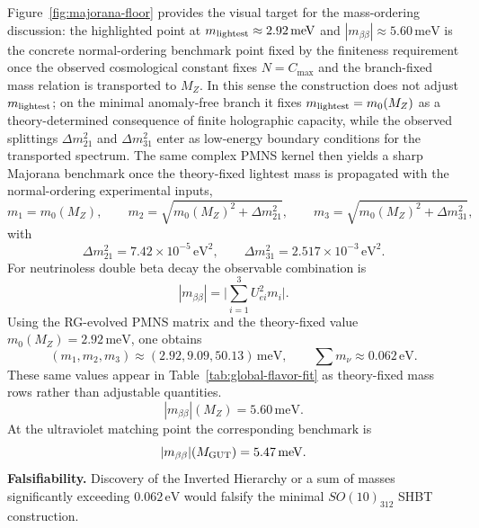 \documentclass[11pt]{article}
\begin{document}
Figure~\ref{fig:majorana-floor} provides the visual target for the mass-ordering discussion: the highlighted point at $m_{\rm lightest}\approx2.92\,\mathrm{meV}$ and $|m_{\beta\beta}|\approx5.60\,\mathrm{meV}$ is the concrete normal-ordering benchmark point fixed by the finiteness requirement once the observed cosmological constant fixes $N=C_{\max}$ and the branch-fixed mass relation is transported to $M_Z$. In this sense the construction does not adjust $m_{\rm lightest}$; on the minimal anomaly-free branch it fixes $m_{\rm lightest}=m_0(M_Z)$ as a theory-determined consequence of finite holographic capacity, while the observed splittings $\Delta m_{21}^2$ and $\Delta m_{31}^2$ enter as low-energy boundary conditions for the transported spectrum. The same complex PMNS kernel then yields a sharp Majorana benchmark once the theory-fixed lightest mass is propagated with the normal-ordering experimental inputs,
\begin{equation}
 m_1 = m_0(M_Z),
 \qquad
 m_2 = \sqrt{m_0(M_Z)^2 + \Delta m_{21}^2},
 \qquad
 m_3 = \sqrt{m_0(M_Z)^2 + \Delta m_{31}^2},
\end{equation}
with
\begin{equation}
 \Delta m_{21}^2 = 7.42\times10^{-5}\,\mathrm{eV}^2,
 \qquad
 \Delta m_{31}^2 = 2.517\times10^{-3}\,\mathrm{eV}^2.
\end{equation}
For neutrinoless double beta decay the observable combination is
\begin{equation}
 |m_{\beta\beta}|
 =
 \lvert \sum_{i=1}^{3} U_{ei}^2 m_i \rvert.
\end{equation}
Using the RG-evolved PMNS matrix and the theory-fixed value $m_0(M_Z)=2.92\,\mathrm{meV}$, one obtains
\begin{equation}
 (m_1,m_2,m_3)\approx(2.92,9.09,50.13)\,\mathrm{meV},
 \qquad
 \sum m_\nu\approx0.062\,\mathrm{eV}.
\end{equation}
These same values appear in Table~\ref{tab:global-flavor-fit} as theory-fixed mass rows rather than adjustable quantities.
\begin{equation}
 \boxed{|m_{\beta\beta}|(M_Z)=5.60\,\mathrm{meV}.}
\end{equation}
At the ultraviolet matching point the corresponding benchmark is
\begin{equation}
 |m_{\beta\beta}|(M_{\rm GUT})=5.47\,\mathrm{meV}.
\end{equation}
\noindent\textbf{Falsifiability.} Discovery of the Inverted Hierarchy or a sum of masses significantly exceeding $0.062\,\mathrm{eV}$ would falsify the minimal $SO(10)_{312}$ SHBT construction.
\end{document}
